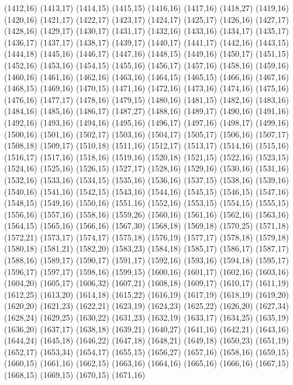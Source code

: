 (1412,16)
(1413,17)
(1414,15)
(1415,15)
(1416,16)
(1417,16)
(1418,27)
(1419,16)
(1420,16)
(1421,17)
(1422,17)
(1423,17)
(1424,17)
(1425,17)
(1426,16)
(1427,17)
(1428,16)
(1429,17)
(1430,17)
(1431,17)
(1432,16)
(1433,16)
(1434,17)
(1435,17)
(1436,17)
(1437,17)
(1438,17)
(1439,17)
(1440,17)
(1441,17)
(1442,16)
(1443,15)
(1444,18)
(1445,16)
(1446,17)
(1447,16)
(1448,15)
(1449,16)
(1450,17)
(1451,15)
(1452,16)
(1453,16)
(1454,15)
(1455,16)
(1456,17)
(1457,16)
(1458,16)
(1459,16)
(1460,16)
(1461,16)
(1462,16)
(1463,16)
(1464,15)
(1465,15)
(1466,16)
(1467,16)
(1468,15)
(1469,16)
(1470,15)
(1471,16)
(1472,16)
(1473,16)
(1474,16)
(1475,16)
(1476,16)
(1477,17)
(1478,16)
(1479,15)
(1480,16)
(1481,15)
(1482,16)
(1483,16)
(1484,16)
(1485,16)
(1486,17)
(1487,27)
(1488,16)
(1489,17)
(1490,16)
(1491,16)
(1492,16)
(1493,16)
(1494,16)
(1495,16)
(1496,17)
(1497,16)
(1498,17)
(1499,16)
(1500,16)
(1501,16)
(1502,17)
(1503,16)
(1504,17)
(1505,17)
(1506,16)
(1507,17)
(1508,18)
(1509,17)
(1510,18)
(1511,16)
(1512,17)
(1513,17)
(1514,16)
(1515,16)
(1516,17)
(1517,16)
(1518,16)
(1519,16)
(1520,18)
(1521,15)
(1522,16)
(1523,15)
(1524,16)
(1525,16)
(1526,15)
(1527,17)
(1528,16)
(1529,16)
(1530,16)
(1531,16)
(1532,16)
(1533,16)
(1534,15)
(1535,16)
(1536,16)
(1537,15)
(1538,16)
(1539,16)
(1540,16)
(1541,16)
(1542,15)
(1543,16)
(1544,16)
(1545,15)
(1546,15)
(1547,16)
(1548,15)
(1549,16)
(1550,16)
(1551,16)
(1552,16)
(1553,15)
(1554,15)
(1555,15)
(1556,16)
(1557,16)
(1558,16)
(1559,26)
(1560,16)
(1561,16)
(1562,16)
(1563,16)
(1564,15)
(1565,16)
(1566,16)
(1567,30)
(1568,18)
(1569,18)
(1570,25)
(1571,18)
(1572,21)
(1573,17)
(1574,17)
(1575,18)
(1576,19)
(1577,17)
(1578,18)
(1579,18)
(1580,18)
(1581,21)
(1582,20)
(1583,23)
(1584,18)
(1585,17)
(1586,17)
(1587,17)
(1588,16)
(1589,17)
(1590,17)
(1591,17)
(1592,16)
(1593,16)
(1594,18)
(1595,17)
(1596,17)
(1597,17)
(1598,16)
(1599,15)
(1600,16)
(1601,17)
(1602,16)
(1603,16)
(1604,20)
(1605,17)
(1606,32)
(1607,21)
(1608,18)
(1609,17)
(1610,17)
(1611,19)
(1612,25)
(1613,20)
(1614,18)
(1615,22)
(1616,19)
(1617,19)
(1618,19)
(1619,20)
(1620,20)
(1621,23)
(1622,21)
(1623,19)
(1624,23)
(1625,22)
(1626,20)
(1627,34)
(1628,24)
(1629,25)
(1630,22)
(1631,23)
(1632,19)
(1633,17)
(1634,25)
(1635,19)
(1636,20)
(1637,17)
(1638,18)
(1639,21)
(1640,27)
(1641,16)
(1642,21)
(1643,16)
(1644,24)
(1645,18)
(1646,22)
(1647,18)
(1648,21)
(1649,18)
(1650,23)
(1651,19)
(1652,17)
(1653,34)
(1654,17)
(1655,15)
(1656,27)
(1657,16)
(1658,16)
(1659,15)
(1660,15)
(1661,16)
(1662,15)
(1663,16)
(1664,16)
(1665,16)
(1666,16)
(1667,15)
(1668,15)
(1669,15)
(1670,15)
(1671,16)
